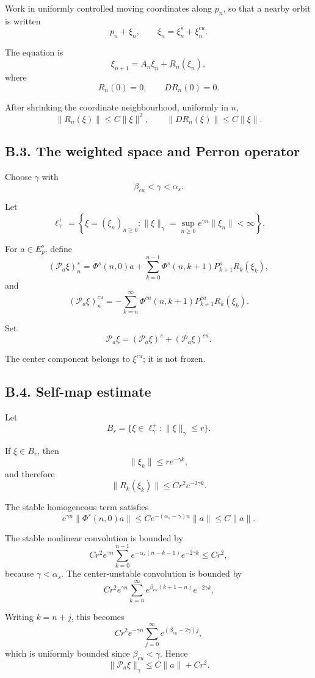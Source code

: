 \documentclass[12pt,a4paper]{article}
\theoremstyle{plain}
\numberwithin{equation}{section}
\numberwithin{theorem}{section}
\begin{document}
Work in uniformly controlled moving coordinates along $p_n$, so that a nearby orbit is written
\[
p_n+\xi_n,
\qquad
\xi_n=\xi_n^s+
\xi_n^{cu}.
\]

The equation is
\[
\xi_{n+1}=A_n\xi_n+R_n(\xi_n),
\]
where
\[
R_n(0)=0,
\qquad DR_n(0)=0.
\]

After shrinking the coordinate neighbourhood, uniformly in $n$,
\[
\|R_n(\xi)\|\le C\|\xi\|^2,
\qquad
\|DR_n(\xi)\|\le C\|\xi\|.
\]

\subsection{B.3. The weighted space and Perron operator}

Choose $\gamma$ with
\[
\beta_{cu}<\gamma<\alpha_s.
\]

Let
\[
\ell_\gamma^+=
\left\{
\xi=(\xi_n)_{n\ge0}:
\|\xi\|_\gamma=
\sup_{n\ge0}e^{\gamma n}\|\xi_n\|<\infty
\right\}.
\]

For $a\in E^s_p$, define
\[
(\mathcal P_a\xi)_n^s
=
\Phi^s(n,0)a+
\sum_{k=0}^{n-1}
\Phi^s(n,k+1)P^s_{k+1}R_k(\xi_k),
\]
and
\[
(\mathcal P_a\xi)_n^{cu}
=
-
\sum_{k=n}^{\infty}
\Phi^{cu}(n,k+1)P^{cu}_{k+1}R_k(\xi_k).
\]

Set
\[
\mathcal P_a\xi=(\mathcal P_a\xi)^s+(\mathcal P_a\xi)^{cu}.
\]

The center component belongs to $\xi^{cu}$; it is not frozen.

\subsection{B.4. Self-map estimate}

Let
\[
B_r=\{\xi\in\ell_\gamma^+:\|\xi\|_\gamma\le r\}.
\]

If $\xi\in B_r$, then
\[
\|\xi_k\|\le r e^{-\gamma k},
\]
and therefore
\[
\|R_k(\xi_k)\|\le Cr^2e^{-2\gamma k}.
\]

The stable homogeneous term satisfies
\[
e^{\gamma n}\|\Phi^s(n,0)a\|
\le
C e^{-(\alpha_s-\gamma)n}\|a\|
\le C\|a\|.
\]

The stable nonlinear convolution is bounded by
\[
C r^2 e^{\gamma n}
\sum_{k=0}^{n-1}e^{-\alpha_s(n-k-1)}e^{-2\gamma k}
\le C r^2,
\]
because $\gamma<\alpha_s$. The center-unstable convolution is bounded by
\[
C r^2 e^{\gamma n}
\sum_{k=n}^{\infty}e^{\beta_{cu}(k+1-n)}e^{-2\gamma k}.
\]

Writing $k=n+j$, this becomes
\[
C r^2 e^{-\gamma n}
\sum_{j=0}^{\infty}e^{(\beta_{cu}-2\gamma)j},
\]
which is uniformly bounded since $\beta_{cu}<\gamma$. Hence
\[
\|\mathcal P_a\xi\|_\gamma
\le
C\|a\|+Cr^2.
\]
\end{document}
